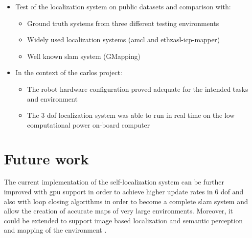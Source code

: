 \begin{itemize}
	\item Test of the localization system on public datasets and comparison with:
	\begin{itemize}
		\item Ground truth systems from three different testing environments
		\item Widely used localization systems (\gls{amcl} and ethzasl-icp-mapper)
		\item Well known \gls{slam} system (GMapping)
	\end{itemize}
 	
	\item In the context of the \gls{carlos} project:
	\begin{itemize}
		\item The robot hardware configuration proved adequate for the intended tasks and environment
		\item The 3 \gls{dof} localization system was able to run in real time on the low computational power on-board computer
	\end{itemize}
\end{itemize}



\section{Future work}

The current implementation of the self-localization system can be further improved with \gls{gpu} support \cite{Tamaki2010} in order to achieve higher update rates in 6 \gls{dof} and also with loop closing algorithms \cite{Grisetti2012} in order to become a complete \gls{slam} system and allow the creation of accurate maps of very large environments. Moreover, it could be extended to support image based localization \cite{Labb2014} and semantic perception and mapping of the environment \cite{Santos2013}.

